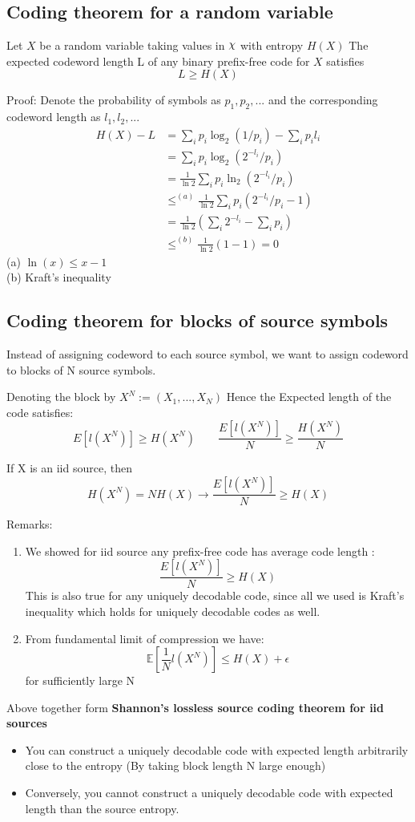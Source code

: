 \documentclass[24pt]{article}
\DeclareRobustCommand{\rchi}{{\mathpalette\irchi\relax}}
\newcommand{\irchi}[2]{\raisebox{\depth}{$#1\chi$}} %
\begin{document}
\subsection{Coding theorem for a random variable}
Let $X$ be a random variable taking values in $\rchi$ with entropy $H(X)$ The expected codeword length L of any binary prefix-free code for $X$ satisfies 
$$ L \ge H(X)$$

Proof: Denote the probability of symbols as $p_1, p_2,...$ and the corresponding codeword length as $\mathit{l}_1, \mathit{l}_2,...$
\begin{align*}
H(X) - L & = \sum_{i}p_i \log_2(1/p_i) - \sum_{i}p_i \mathit{l}_i \\ 
& = \sum_{i}p_i \log_2(2^{-\mathit{l}_i}/p_i)\\
& = \frac{1}{\ln 2} \sum_{i}p_i \ln_2(2^{-\mathit{l}_i}/p_i)\\
& \le^{(a)} \frac{1}{\ln 2} \sum_{i}p_i \left(2^{-\mathit{l}_i}/p_i -1\right) \\
& = \frac{1}{\ln 2} \left( \sum_{i}2^{-\mathit{l}_i} - \sum_{i}p_i \right) \\
& \le^{(b)} \frac{1}{\ln 2}(1 -1 )=0
\end{align*}
(a) $ \ln(x) \le x-1$ \\
(b) Kraft's inequality
\subsection{Coding theorem for blocks of source symbols}
Instead of assigning codeword to each source symbol, we want to assign codeword to blocks of N source symbols. 

Denoting the block by $X^N := (X_1,...,X_N)$ Hence the Expected length of the code satisfies:
$$E[\mathit{l}(X^N)] \ge H(X^N) \qquad  \frac{E[\mathit{l}(X^N)]}{N} \ge \frac{H(X^N)}{N}$$

If X is an iid source, then 
$$H(X^N) = NH(X) \rightarrow \frac{E[\mathit{l}(X^N)]}{N} \ge   H(X)$$

Remarks:
\begin{enumerate}
\item We showed for iid source any prefix-free code has average code length :
$$\frac{E[\mathit{l}(X^N)]}{N} \ge   H(X)$$
This is also true for any uniquely decodable code, since all we used is Kraft's inequality which holds for uniquely decodable codes as well.
\item From fundamental limit of compression we have:
$$\mathbb{E}[\frac{1}{N}\mathit{l}(X^N)] \le H(X) + \epsilon$$
for sufficiently large N
\end{enumerate}
Above together form \textbf{Shannon's lossless source coding theorem for iid sources}
\begin{itemize}
\item You can construct a uniquely decodable code with expected length arbitrarily close to the entropy (By taking block length N large enough)
\item Conversely, you cannot construct a uniquely decodable code with expected length than the source entropy.
\end{itemize}
\end{document}
